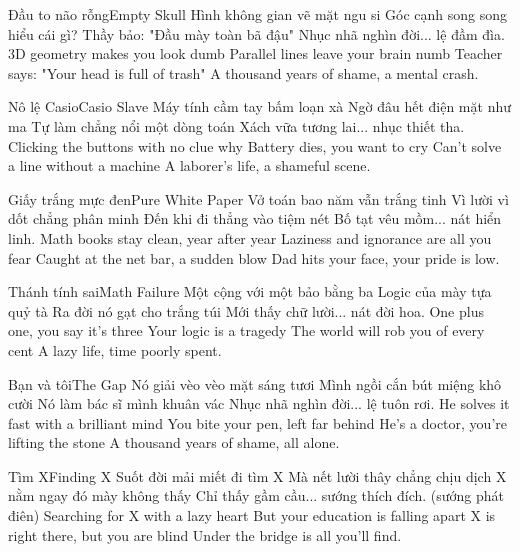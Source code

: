 \begin{tutuyetbox}{Đầu to não rỗng}{Empty Skull}
Hình không gian vẽ mặt ngu si
Góc cạnh song song hiểu cái gì?
Thầy bảo: "Đầu mày toàn bã đậu"
Nhục nhã nghìn đời... lệ đầm đìa.
\tcblower
3D geometry makes you look dumb
Parallel lines leave your brain numb
Teacher says: "Your head is full of trash"
A thousand years of shame, a mental crash.
\end{tutuyetbox}

\begin{tutuyetbox}{Nô lệ Casio}{Casio Slave}
Máy tính cầm tay bấm loạn xà
Ngờ đâu hết điện mặt như ma
Tự làm chẳng nổi một dòng toán
Xách vữa tương lai... nhục thiết tha.
\tcblower
Clicking the buttons with no clue why
Battery dies, you want to cry
Can't solve a line without a machine
A laborer's life, a shameful scene.
\end{tutuyetbox}

\begin{tutuyetbox}{Giấy trắng mực đen}{Pure White Paper}
Vở toán bao năm vẫn trắng tinh
Vì lười vì dốt chẳng phân minh
Đến khi đi thẳng vào tiệm nét
Bố tạt vêu mồm... nát hiển linh.
\tcblower
Math books stay clean, year after year
Laziness and ignorance are all you fear
Caught at the net bar, a sudden blow
Dad hits your face, your pride is low.
\end{tutuyetbox}

\begin{tutuyetbox}{Thánh tính sai}{Math Failure}
Một cộng với một bảo bằng ba
Logic của mày tựa quỷ tà
Ra đời nó gạt cho trắng túi
Mới thấy chữ lười... nát đời hoa.
\tcblower
One plus one, you say it's three
Your logic is a tragedy
The world will rob you of every cent
A lazy life, time poorly spent.
\end{tutuyetbox}

\begin{tutuyetbox}{Bạn và tôi}{The Gap}
Nó giải vèo vèo mặt sáng tươi
Mình ngồi cắn bút miệng khô cười
Nó làm bác sĩ mình khuân vác
Nhục nhã nghìn đời... lệ tuôn rơi.
\tcblower
He solves it fast with a brilliant mind
You bite your pen, left far behind
He's a doctor, you're lifting the stone
A thousand years of shame, all alone.
\end{tutuyetbox}

\begin{tutuyetbox}{Tìm X}{Finding X}
Suốt đời mải miết đi tìm X
Mà nết lười thây chẳng chịu dịch
X nằm ngay đó mày không thấy
Chỉ thấy gầm cầu... sướng thích đích. (sướng phát điên)
\tcblower
Searching for X with a lazy heart
But your education is falling apart
X is right there, but you are blind
Under the bridge is all you'll find.
\end{tutuyetbox}

